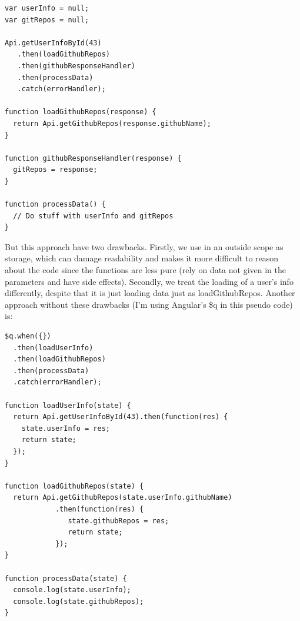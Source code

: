 \documentclass[a4paper,12pt]{article}
\begin{document}
\begin{lstlisting}[caption=Pseudo code showing an approach using promises where we are loading two pieces of data\, where the second is dependent on the first, frame=single]
var userInfo = null; 
var gitRepos = null;

Api.getUserInfoById(43)
   .then(loadGithubRepos)
   .then(githubResponseHandler)
   .then(processData)
   .catch(errorHandler);

function loadGithubRepos(response) {
  return Api.getGithubRepos(response.githubName);
}

function githubResponseHandler(response) {
  gitRepos = response;
}

function processData() {
  // Do stuff with userInfo and gitRepos
}
\end{lstlisting}

But this approach have two drawbacks. Firstly, we use in an outside scope as storage, which can damage readability and makes it more difficult to reason about the code since the functions are less pure (rely on data not given in the parameters and have side effects). 
Secondly, we treat the loading of a user's info differently, despite that it is just loading data just as loadGithubRepos.
Another approach without these drawbacks (I'm using Angular's \$q in this pseudo code) is:

\begin{lstlisting}[caption=Pseudo code showing an approach using promises where we are loading two pieces of data\, where the second is dependent on the first, frame=single]
$q.when({})
  .then(loadUserInfo)
  .then(loadGithubRepos)
  .then(processData)
  .catch(errorHandler);

function loadUserInfo(state) {
  return Api.getUserInfoById(43).then(function(res) {
    state.userInfo = res;
    return state;
  });
}

function loadGithubRepos(state) {
  return Api.getGithubRepos(state.userInfo.githubName)
            .then(function(res) {
               state.githubRepos = res;
               return state;
            });
}

function processData(state) {
  console.log(state.userInfo);
  console.log(state.githubRepos);
}
\end{lstlisting}
\end{document}
